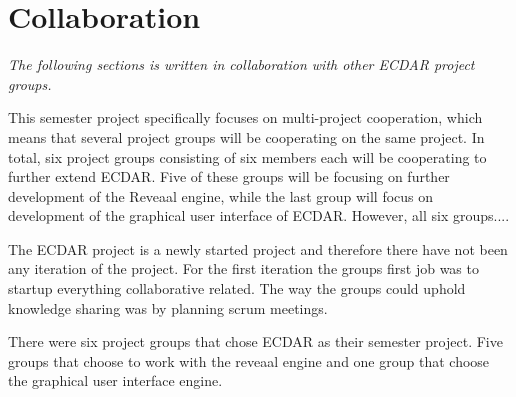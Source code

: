 \section{Collaboration}\label{Scrum/agile-cooperation}
\textit{The following sections is written in collaboration with other ECDAR project groups.}



This semester project specifically focuses on multi-project cooperation, which means that several project groups will be cooperating on the same project. In total, six project groups consisting of six members each will be cooperating to further extend ECDAR. Five of these groups will be focusing on further development of the Reveaal engine, while the last group will focus on development of the graphical user interface of ECDAR. However, all six groups....


The ECDAR project is a newly started project and therefore there have not been any iteration of the project.
For the first iteration the groups first job was to startup everything collaborative related. 
The way the groups could uphold knowledge sharing was by planning scrum meetings.

There were six project groups that chose ECDAR as their semester project. 
Five groups that choose to work with the reveaal engine and one group that choose the graphical user interface engine.



